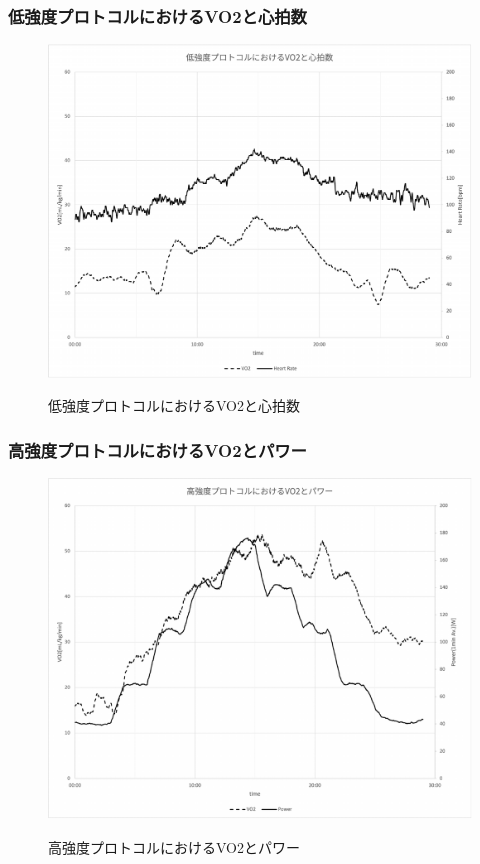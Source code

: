 \subsubsection{低強度プロトコルにおけるVO2と心拍数}

\begin{figure}[H]
  \begin{center}
    \label{fig:light_vo2_hr}
    \includegraphics[width=12cm]{fig/light_vo2_hr}
    \caption{低強度プロトコルにおけるVO2と心拍数}
  \end{center}
\end{figure}

\subsubsection{高強度プロトコルにおけるVO2とパワー}

\begin{figure}[H]
  \begin{center}
    \label{fig:hard_vo2_power}
    \includegraphics[width=12cm]{fig/hard_vo2_power}
    \caption{高強度プロトコルにおけるVO2とパワー}
  \end{center}
\end{figure}

